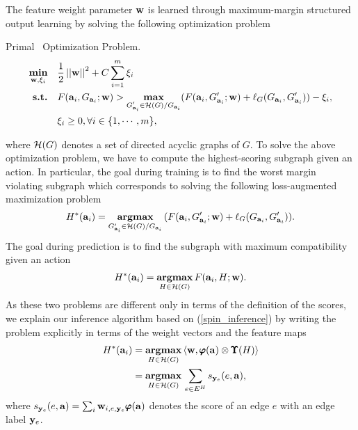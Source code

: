 {%
The feature weight parameter $\mathbf {w}$ is learned through maximum-margin structured output learning by solving the following optimization problem
\begin{definition}{Primal \spin\ Optimization Problem.}
\begin{align*}
	\underset{\mathbf {w},\mathbf{\xi}_i}{\textbf{min}} &\quad \frac{1}{2}\left|\left| \mathbf {w} \right|\right|^2+C\sum_{i=1}^{m}\xi_i\\
	\textbf{s.t.} &\quad F(\mathbf {a}_i,G_{\mathbf {a}_i};\mathbf {w}) > \underset{\substack{G_{\mathbf {a}_i}'\in\mathcal{H}(G)/G_{\mathbf {a}_i}}}{\textbf{max}}(F(\mathbf {a}_i,G_{\mathbf {a}_i}';\mathbf {w})+\mathbf {\ell}_{G}(G_{\mathbf {a}_i},G_{\mathbf {a}_i}')) - \xi_i,\\
	&\quad \xi_i\ge0, \forall i\in\{1,\cdots,m\},
\end{align*}
\end{definition}
\noindent
where $\mathcal{H}(G)$ denotes a set of directed acyclic graphs of $G$.
To solve the above optimization problem, we have to compute the highest-scoring subgraph given an action. 
In particular, the goal during training is to find the worst margin violating subgraph which corresponds to solving the following loss-augmented maximization problem
\begin{align*}
	H^*(\mathbf {a}_i) = \underset{G_{\mathbf {a}_i}'\in\mathcal{H}(G)/G_{\mathbf {a}_i}}{\textbf{argmax}}\, (F(\mathbf {a}_i,G_{\mathbf {a}_i}';\mathbf {w})+\mathbf {\ell}_{G}(G_{\mathbf {a}_i},G_{\mathbf {a}_i}')).
\end{align*}
The goal during prediction is to find the subgraph with maximum compatibility given an action
\begin{align}
	H^*(\mathbf {a}_i) = \underset{H\in\mathcal{H}(G)}{\textbf{argmax}}\, F(\mathbf {a}_i,H;\mathbf {w}) \label{spin_inference}.
\end{align}
As these two problems are different only in terms of the definition of the scores, we explain our inference algorithm based on (\ref{spin_inference}) by writing the problem explicitly in terms of the weight vectors and the feature maps
\begin{align}
	H^*(\mathbf {a}_i) &= \underset{H\in\mathcal{H}(G)}{\textbf{argmax}}\, \langle \mathbf {w}, \pmb \varphi(\mathbf {a})\otimes\pmb \Upsilon(H) \rangle \nonumber \\
	&= \underset{H\in\mathcal{H}(G)}{\textbf{argmax}}\, \sum_{e\in E^H}s_{\mathbf {y}_e}(e,\mathbf {a}), \label{spin_np}
\end{align}
where $s_{\mathbf {y}_e}(e,\mathbf {a}) = \sum_{i}\mathbf {w}_{i,e,\mathbf {y}_e}\pmb \varphi(\mathbf {a})$ denotes the score of an edge $e$ with an edge label $\mathbf {y}_e$.

}
